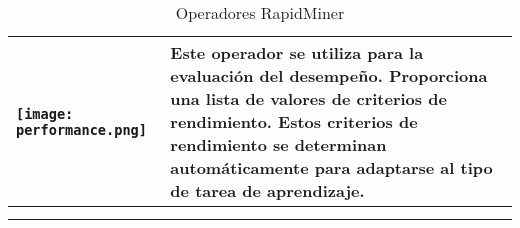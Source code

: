 \begin{longtable}{>{\centering\arraybackslash}m{3cm} >{\centering\arraybackslash}m{8cm}}
		 \texttt{[image: performance.png]} & Este operador se utiliza para la evaluación del desempeño. Proporciona una lista de valores de criterios de rendimiento. Estos criterios de rendimiento se determinan automáticamente para adaptarse al tipo de tarea de aprendizaje. \\	\hline \\		

	\caption{Operadores RapidMiner}
	\label{tabla:operadores}
\end{longtable}